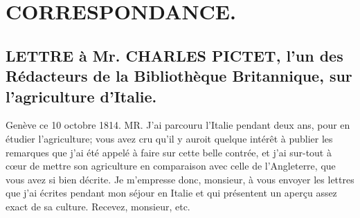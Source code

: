 \setcounter{page}{362}
\chapter{CORRESPONDANCE.}
\section{LETTRE à Mr. CHARLES PICTET, l'un des Rédacteurs de la Bibliothèque Britannique, sur l'agriculture d'Italie.}
Genève ce 10 octobre 1814.
MR.
J'ai parcouru l'Italie pendant deux ans, pour en étudier l'agriculture; vous avez cru qu'il y auroit quelque intérêt à publier les remarques que j'ai été appelé à faire sur cette belle contrée, et j'ai sur-tout à cœur de mettre son agriculture en comparaison avec celle de l'Angleterre, que vous avez si bien décrite. Je m'empresse donc, monsieur, à vous envoyer les lettres que j'ai écrites pendant\setcounter{page}{363} mon séjour en Italie et qui présentent un aperçu assez exact de sa culture. Recevez, monsieur, etc.
